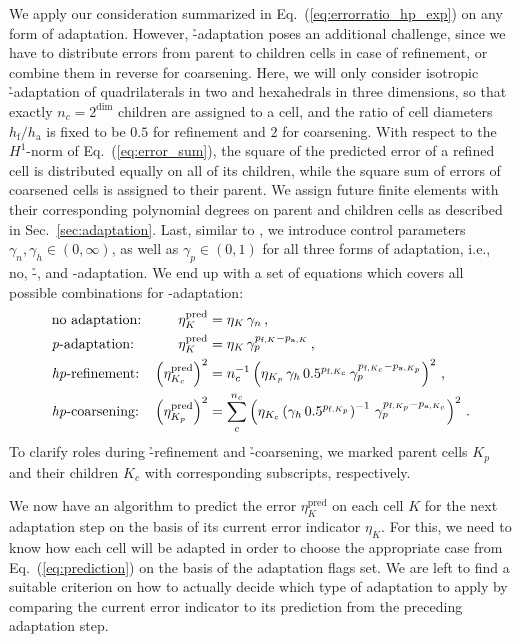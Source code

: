 We apply our consideration summarized in Eq.~(\ref{eq:errorratio_hp_exp}) on any form of adaptation. However, \h-adaptation poses an additional challenge, since we have to distribute errors from parent to children cells in case of refinement, or combine them in reverse for coarsening. Here, we will only consider isotropic \h-adaptation of quadrilaterals in two and hexahedrals in three dimensions, so that exactly $n_c = 2^\text{dim}$ children are assigned to a cell, and the ratio of cell diameters $h_\text{f} / h_\text{a}$ is fixed to be $0.5$ for refinement and $2$ for coarsening. With respect to the $H^1$-norm of Eq.~(\ref{eq:error_sum}), the square of the predicted error of a refined cell is distributed equally on all of its children, while the square sum of errors of coarsened cells is assigned to their parent. We assign future finite elements with their corresponding polynomial degrees on parent and children cells as described in Sec.~\ref{sec:adaptation}. Last, similar to \textcite{melenk2001}, we introduce control parameters $\gamma_n, \gamma_h \in (0, \infty)$, as well as $\gamma_p \in (0,1)$ for all three forms of adaptation, i.e., no, \h-, and \p-adaptation. We end up with a set of equations which covers all possible combinations for \hp-adaptation:
\begin{subequations}
\begin{align}
&\text{no adaptation:} & \eta^\text{pred}_K &= \eta_K \, \gamma_n \,\text{,} \\
&\text{\textit{p}-adaptation:} & \eta^\text{pred}_K &= \eta_K \, \gamma_p^{p_{\text{f},K} - p_{\text{a},K}} \,\text{,} \\
&\text{\textit{hp}-refinement:} & \left( \eta^\text{pred}_{K_c} \right)^2 &= n_c^{-1} \left( \eta_{K_p} \, \gamma_h \, 0.5^{p_{\text{f},K_c}} \, \gamma_p^{p_{\text{f},K_c} - p_{\text{a},K_p}} \right)^2 \,\text{,} \\
&\text{\textit{hp}-coarsening:} & \left( \eta^\text{pred}_{K_p} \right)^2 &= \sum\limits_c^{n_c} \left( \eta_{K_c} \left( \gamma_h \, 0.5^{p_{\text{f},K_p}} \right)^{-1} \, \gamma_p^{p_{\text{f},K_p} - p_{\text{a},K_c}} \right)^2 \,\text{.} 
\end{align}
\label{eq:prediction}
\end{subequations}
To clarify roles during \h-refinement and \h-coarsening, we marked parent cells $K_p$ and their children $K_c$ with corresponding subscripts, respectively.

We now have an algorithm to predict the error $\eta^\text{pred}_K$ on each cell $K$ for the next adaptation step on the basis of its current error indicator $\eta_K$. For this, we need to know how each cell will be adapted in order to choose the appropriate case from Eq.~(\ref{eq:prediction}) on the basis of the adaptation flags set. We are left to find a suitable criterion on how to actually decide which type of adaptation to apply by comparing the current error indicator to its prediction from the preceding adaptation step.

